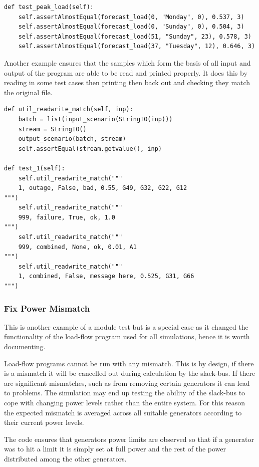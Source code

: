 \documentclass[a4paper,oneside,12pt]{report}
\begin{document}
\begin{verbatim}
def test_peak_load(self):
    self.assertAlmostEqual(forecast_load(0, "Monday", 0), 0.537, 3)
    self.assertAlmostEqual(forecast_load(0, "Sunday", 0), 0.504, 3)
    self.assertAlmostEqual(forecast_load(51, "Sunday", 23), 0.578, 3)
    self.assertAlmostEqual(forecast_load(37, "Tuesday", 12), 0.646, 3)
\end{verbatim}

Another example ensures that the samples which form the basis of all
input and output of the program are able to be read and printed
properly. It does this by reading in some test cases then printing then
back out and checking they match the original file.

\begin{verbatim}
def util_readwrite_match(self, inp):
    batch = list(input_scenario(StringIO(inp)))
    stream = StringIO()
    output_scenario(batch, stream)
    self.assertEqual(stream.getvalue(), inp)

def test_1(self):
    self.util_readwrite_match("""
    1, outage, False, bad, 0.55, G49, G32, G22, G12
""")
    self.util_readwrite_match("""
    999, failure, True, ok, 1.0
""")
    self.util_readwrite_match("""
    999, combined, None, ok, 0.01, A1
""")
    self.util_readwrite_match("""
    1, combined, False, message here, 0.525, G31, G66
""")
\end{verbatim}

\subsubsection{Fix Power Mismatch}

This is another example of a module test but is a special case as it
changed the functionality of the load-flow program used for all
simulations, hence it is worth documenting.

Load-flow programs cannot be run with any mismatch. This is by design,
if there is a mismatch it will be cancelled out during calculation by the
slack-bus. If there are significant mismatches, such as from removing
certain generators it can lead to problems.
The simulation may end up testing the ability of the slack-bus to cope
with changing power levels rather than the entire system. For this reason
the expected mismatch is averaged across all suitable generators
according to their current power levels.

The code ensures that generators power limits are observed so that if a
generator was to hit a limit it is simply set at full power and the rest
of the power distributed among the other generators.
\end{document}
